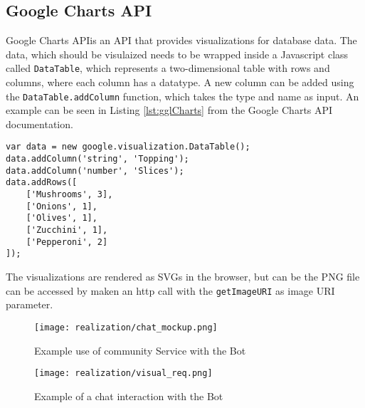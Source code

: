 \subsection{Google Charts API}
Google Charts API\footnotemark is an API that provides visualizations for database data. The data, which should be visulaized needs to be wrapped inside a Javascript class called \texttt{DataTable}, which represents a two-dimensional table with rows and columns, where each column has a datatype.
A new column can be added using the \texttt{DataTable.addColumn} function, which takes the type and name as input. An example can be seen in Listing \ref{lst:gglCharts} from the Google Charts API documentation\footnotemark[\value{footnote}].

\begin{lstlisting}[caption=Example use of the DataTable class,captionpos=b,label={lst:gglCharts}]
var data = new google.visualization.DataTable();
data.addColumn('string', 'Topping');
data.addColumn('number', 'Slices');
data.addRows([
	['Mushrooms', 3],
	['Onions', 1],
	['Olives', 1], 
	['Zucchini', 1],
	['Pepperoni', 2]
]);
\end{lstlisting}

The visualizations are rendered as SVGs in the browser, but can be the PNG file can be accessed by maken an http call with the \texttt{getImageURI} as image URI parameter.



\begin{figure}
  \centering
  \texttt{[image: realization/chat\_mockup.png]}
  \caption{Example use of community Service with the Bot}
  \label{fig:chatMockup}
\end{figure}

\begin{figure}
  \centering
  \texttt{[image: realization/visual\_req.png]}
  \caption{Example of a chat interaction with the Bot}
  \label{fig:visualReq}
\end{figure}